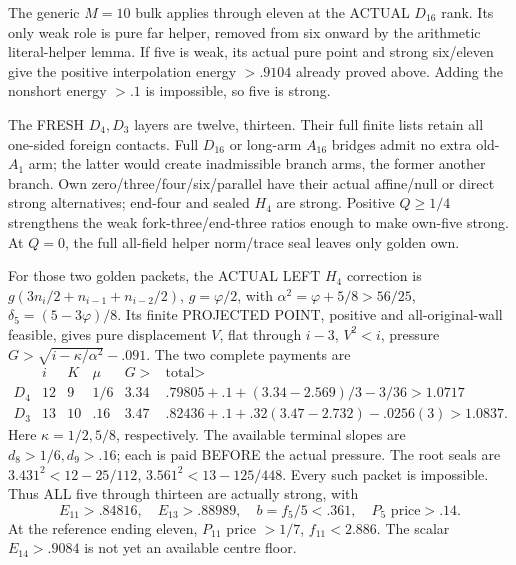 The generic \(M=10\) bulk applies through
eleven at the ACTUAL \(D_{16}\) rank.
Its only weak role is pure far helper,
removed from six onward by the arithmetic
literal-helper lemma.
If five is weak, its actual pure point
and strong six/eleven give the positive
interpolation energy \(>.9104\) already
proved above.
Adding the nonshort energy \(>.1\)
is impossible, so five is strong.

The FRESH \(D_4,D_3\) layers are twelve,
thirteen.
Their full finite lists retain all
one-sided foreign contacts.
Full \(D_{16}\) or long-arm \(A_{16}\)
bridges admit no extra old-\(A_1\) arm;
the latter would create inadmissible
branch arms, the former another branch.
Own zero/three/four/six/parallel have
their actual affine/null or direct
strong alternatives; end-four and sealed
\(H_4\) are strong.
Positive \(Q\ge1/4\) strengthens the weak
fork-three/end-three ratios enough to
make own-five strong.
At \(Q=0\), the full all-field helper
norm/trace seal leaves only golden own.

For those two golden packets, the ACTUAL
LEFT \(H_4\) correction is
\(g(3n_i/2+n_{i-1}+n_{i-2}/2)\),
\(g=\varphi/2\), with
\(\alpha^2=\varphi+5/8>56/25\),
\(\delta_5=(5-3\varphi)/8\).
Its finite PROJECTED POINT, positive and
all-original-wall feasible, gives pure
displacement \(V\), flat through \(i-3\),
\(V^2<i\), pressure
\(G>\sqrt{i-\kappa/\alpha^2}-.091\).
The two complete payments are
\[
\begin{array}{c|c|c|c|c|c}
 &i&K&\mu&G>&\text{total}>\\ \hline
 D_4&12&9&1/6&3.34&
 .79805+.1+(3.34-2.569)/3-3/36>1.0717\\
 D_3&13&10&.16&3.47&
 .82436+.1+.32(3.47-2.732)-.0256(3)>1.0837 .
\end{array}
\]
Here \(\kappa=1/2,5/8\), respectively.
The available terminal slopes are
\(d_8>1/6,d_9>.16\); each is paid
BEFORE the actual pressure.
The root seals are
\(3.431^2<12-25/112\),
\(3.561^2<13-125/448\).
Every such packet is impossible.
Thus ALL five through thirteen are
actually strong, with
\[
 E_{11}>.84816,\quad E_{13}>.88989,\quad
 b=f_5/5<.361,\quad P_5\text{ price}>.14 .
\]
At the reference ending eleven,
\(P_{11}\) price \(>1/7\), \(f_{11}<2.886\).
The scalar \(E_{14}>.9084\) is not yet
an available centre floor.

